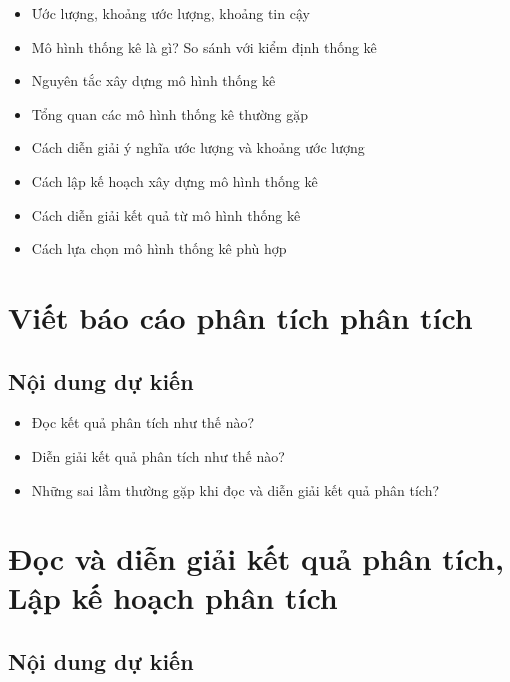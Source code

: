 \documentclass[]{tufte-book}
\providecommand{\tightlist}{%
  \setlength{\itemsep}{0pt}\setlength{\parskip}{0pt}}
\begin{document}
\begin{itemize}
\item
  Ước lượng, khoảng ước lượng, khoảng tin cậy
\item
  Mô hình thống kê là gì? So sánh với kiểm định thống kê
\item
  Nguyên tắc xây dựng mô hình thống kê
\item
  Tổng quan các mô hình thống kê thường gặp
\item
  Cách diễn giải ý nghĩa ước lượng và khoảng ước lượng
\item
  Cách lập kế hoạch xây dựng mô hình thống kê
\item
  Cách diễn giải kết quả từ mô hình thống kê
\item
  Cách lựa chọn mô hình thống kê phù hợp
\end{itemize}

\hypertarget{vit-bao-cao-phan-tich-phan-tich}{%
\chapter{Viết báo cáo phân tích phân tích}\label{vit-bao-cao-phan-tich-phan-tich}}

\hypertarget{ni-dung-d-kin-3}{%
\section{Nội dung dự kiến}\label{ni-dung-d-kin-3}}

\begin{itemize}
\tightlist
\item
  Đọc kết quả phân tích như thế nào?
\item
  Diễn giải kết quả phân tích như thế nào?
\item
  Những sai lầm thường gặp khi đọc và diễn giải kết quả phân tích?
\end{itemize}

\hypertarget{oc-va-din-giai-kt-qua-phan-tich-lp-k-hoach-phan-tich}{%
\chapter{Đọc và diễn giải kết quả phân tích, Lập kế hoạch phân tích}\label{oc-va-din-giai-kt-qua-phan-tich-lp-k-hoach-phan-tich}}

\hypertarget{ni-dung-d-kin-4}{%
\section{Nội dung dự kiến}\label{ni-dung-d-kin-4}}
\end{document}
